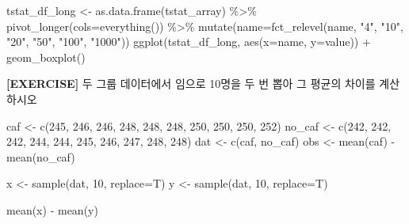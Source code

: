 \documentclass[
]{book}
\newenvironment{Shaded}{\begin{snugshade}}{\end{snugshade}}
\newcommand{\AttributeTok}[1]{\textcolor[rgb]{0.77,0.63,0.00}{#1}}
\newcommand{\DecValTok}[1]{\textcolor[rgb]{0.00,0.00,0.81}{#1}}
\newcommand{\FunctionTok}[1]{\textcolor[rgb]{0.00,0.00,0.00}{#1}}
\newcommand{\NormalTok}[1]{#1}
\newcommand{\OtherTok}[1]{\textcolor[rgb]{0.56,0.35,0.01}{#1}}
\newcommand{\SpecialCharTok}[1]{\textcolor[rgb]{0.00,0.00,0.00}{#1}}
\newcommand{\StringTok}[1]{\textcolor[rgb]{0.31,0.60,0.02}{#1}}
\begin{document}
\begin{Shaded}
\begin{Highlighting}[]
\NormalTok{tstat\_df\_long }\OtherTok{\textless{}{-}} \FunctionTok{as.data.frame}\NormalTok{(tstat\_array) }\SpecialCharTok{\%\textgreater{}\%} 
  \FunctionTok{pivot\_longer}\NormalTok{(}\AttributeTok{cols=}\FunctionTok{everything}\NormalTok{()) }\SpecialCharTok{\%\textgreater{}\%} 
  \FunctionTok{mutate}\NormalTok{(}\AttributeTok{name=}\FunctionTok{fct\_relevel}\NormalTok{(name, }\StringTok{"4"}\NormalTok{, }\StringTok{"10"}\NormalTok{, }\StringTok{"20"}\NormalTok{, }\StringTok{"50"}\NormalTok{, }\StringTok{"100"}\NormalTok{, }\StringTok{"1000"}\NormalTok{))}
\FunctionTok{ggplot}\NormalTok{(tstat\_df\_long, }\FunctionTok{aes}\NormalTok{(}\AttributeTok{x=}\NormalTok{name, }\AttributeTok{y=}\NormalTok{value)) }\SpecialCharTok{+}
  \FunctionTok{geom\_boxplot}\NormalTok{()}
\end{Highlighting}
\end{Shaded}

\textbf{{[}EXERCISE{]}} 두 그룹 데이터에서 임으로 10명을 두 번 뽑아 그 평균의 차이를 계산하시오

\begin{Shaded}
\begin{Highlighting}[]

\NormalTok{caf }\OtherTok{\textless{}{-}} \FunctionTok{c}\NormalTok{(}\DecValTok{245}\NormalTok{, }\DecValTok{246}\NormalTok{, }\DecValTok{246}\NormalTok{, }\DecValTok{248}\NormalTok{, }\DecValTok{248}\NormalTok{, }\DecValTok{248}\NormalTok{, }\DecValTok{250}\NormalTok{, }\DecValTok{250}\NormalTok{, }\DecValTok{250}\NormalTok{, }\DecValTok{252}\NormalTok{)}
\NormalTok{no\_caf }\OtherTok{\textless{}{-}} \FunctionTok{c}\NormalTok{(}\DecValTok{242}\NormalTok{, }\DecValTok{242}\NormalTok{, }\DecValTok{242}\NormalTok{, }\DecValTok{244}\NormalTok{, }\DecValTok{244}\NormalTok{, }\DecValTok{245}\NormalTok{, }\DecValTok{246}\NormalTok{, }\DecValTok{247}\NormalTok{, }\DecValTok{248}\NormalTok{, }\DecValTok{248}\NormalTok{)}
\NormalTok{dat }\OtherTok{\textless{}{-}} \FunctionTok{c}\NormalTok{(caf, no\_caf) }
\NormalTok{obs }\OtherTok{\textless{}{-}} \FunctionTok{mean}\NormalTok{(caf) }\SpecialCharTok{{-}} \FunctionTok{mean}\NormalTok{(no\_caf)}

\NormalTok{x }\OtherTok{\textless{}{-}} \FunctionTok{sample}\NormalTok{(dat, }\DecValTok{10}\NormalTok{, }\AttributeTok{replace=}\NormalTok{T)}
\NormalTok{y }\OtherTok{\textless{}{-}} \FunctionTok{sample}\NormalTok{(dat, }\DecValTok{10}\NormalTok{, }\AttributeTok{replace=}\NormalTok{T)}

\FunctionTok{mean}\NormalTok{(x) }\SpecialCharTok{{-}} \FunctionTok{mean}\NormalTok{(y)}
\end{Highlighting}
\end{Shaded}
\end{document}
